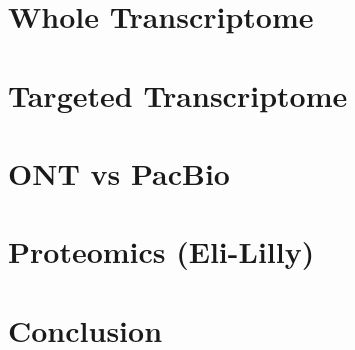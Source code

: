 \documentclass[a4paper,12pt,oneside]{report}
\begin{document}
\chapter{Whole Transcriptome}


\chapter{Targeted Transcriptome}
%

\chapter{ONT vs PacBio}


\chapter{Proteomics (Eli-Lilly)}

\chapter{Conclusion}
%


\end{document}
